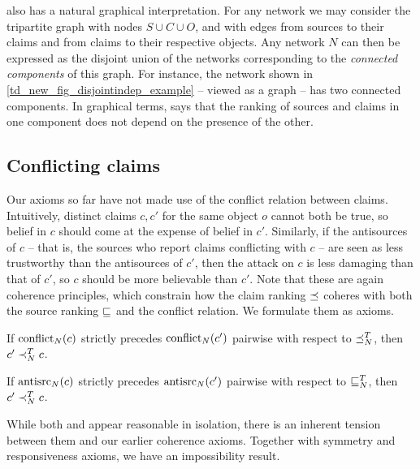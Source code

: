 \disjointindependence{} also has a natural graphical interpretation. For any
network we may consider the tripartite graph with nodes $S \cup C \cup O$, and
with edges from sources to their claims and from claims to their respective
objects. Any network $N$ can then be expressed as the disjoint union of the
networks corresponding to the \emph{connected components} of this graph. For
instance, the network shown in \cref{td_new_fig_disjointindep_example} --
viewed as a graph -- has two connected components. In graphical terms,
\disjointindependence{} says that the ranking of sources and claims in one
component does not depend on the presence of the other.

\subsection{Conflicting claims}
\label{td_new_sec_conflicting_claims}

Our axioms so far have not made use of the conflict relation between claims.
Intuitively, distinct claims $c, c'$ for the same object $o$ cannot both be
true, so belief in $c$ should come at the expense of belief in $c'$. Similarly,
if the antisources of $c$ -- that is, the sources who report claims conflicting
with $c$ -- are seen as less trustworthy than the antisources of $c'$, then the
attack on $c$ is less damaging than that of $c'$, so $c$ should be more
believable than $c'$. Note that these are again coherence principles, which
constrain how the claim ranking $\preceq$ coheres with both the source ranking
$\sqsubseteq$ and the conflict relation. We formulate them as axioms.

\begin{axiomlist}
\begin{axiom}[\conflictcoherence{}]
    If $\operatorname{conflict}_N(c)$ strictly precedes $\operatorname{conflict}_N(c')$ pairwise with
    respect to $\preceq_N^T$, then $c' \prec_N^T c$.
\end{axiom}
\begin{axiom}[\anticoherence{}]
    If $\operatorname{antisrc}_N(c)$ strictly precedes $\operatorname{antisrc}_N(c')$ pairwise with respect
    to $\sqsubseteq_N^T$, then $c' \prec_N^T c$.
\end{axiom}
\end{axiomlist}

While both \conflictcoherence{} and \anticoherence{} appear reasonable in
isolation, there is an inherent tension between them and our earlier coherence
axioms. Together with symmetry and responsiveness axioms, we have an
impossibility result.

